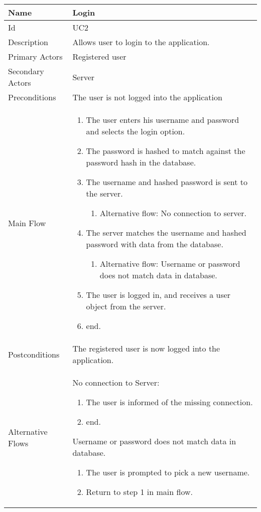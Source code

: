 \begin{tabularx}{\textwidth}{|l|X|}
\hline
Name              & Login \\ \hline 
Id                & UC2 \\ \hline
Description       & Allows user to login to the application. \\ \hline
Primary Actors    & Registered user \\ \hline
Secondary Actors  & Server \\ \hline
Preconditions     & The user is not logged into the application \\ \hline
Main Flow         &
{\footnotesize \begin{enumerate}
\item The user enters his username and password and selects the login option.
\item The password is hashed to match against the password hash in the database.
\item The username and hashed password is sent to the server.
\begin{enumerate}
\item Alternative flow: No connection to server.
\end{enumerate}
\item The server matches the username and hashed password with data from the database.
\begin{enumerate}
\item Alternative flow: Username or password does not match data in database.
\end{enumerate}
\item The user is logged in, and receives a user object from the server.
\item end.
\end{enumerate}} \\ \hline
Postconditions    & The registered user is now logged into the application. \\ \hline
Alternative Flows & 
No connection to Server:
{\footnotesize \begin{enumerate}
\item The user is informed of the missing connection.
\item end.
\end{enumerate}}
Username or password does not match data in database.
{\footnotesize \begin{enumerate}
\item The user is prompted to pick a new username.
\item Return to step 1 in main flow.
\end{enumerate}}
\\ \hline
\end{tabularx}

